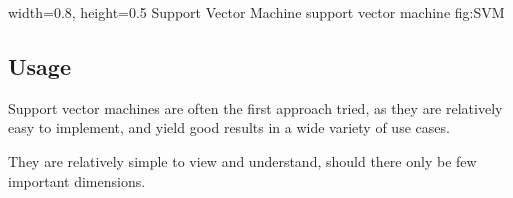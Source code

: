     {width=0.8\textwidth, height=0.5\textheight} %
    {Support Vector Machine}   %
    {support vector machine}   %
    {fig:SVM}    %

\subsection{Usage}
Support vector machines are often the first approach tried, as they are relatively easy to implement, and yield good results in a wide variety of use cases. 

They are relatively simple to view and understand, should there only be few important dimensions.

